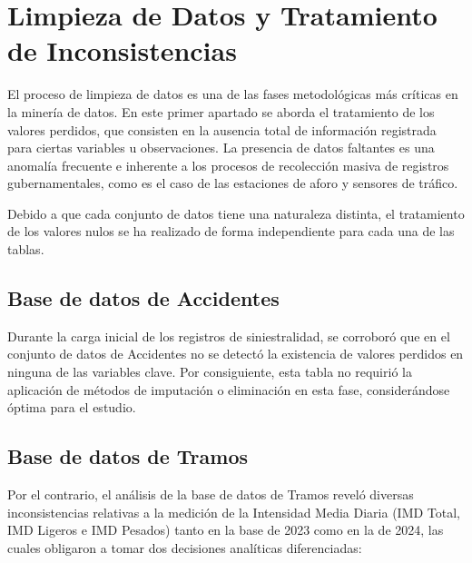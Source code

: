 \documentclass[twoside,a4paper,12pt,onecolumn,openany]{book}
\begin{document}
\setcounter{section}{0}
\setcounter{figure}{0}\setcounter{table}{0}

\section{Limpieza de Datos y Tratamiento de Inconsistencias}
\vspace{0.5cm}

El proceso de limpieza de datos es una de las fases metodológicas más críticas en la minería de datos. En este primer apartado se aborda el tratamiento de los valores perdidos, que consisten en la ausencia total de información registrada para ciertas variables u observaciones. La presencia de datos faltantes es una anomalía frecuente e inherente a los procesos de recolección masiva de registros gubernamentales, como es el caso de las estaciones de aforo y sensores de tráfico.

\vspace{0.5cm}

Debido a que cada conjunto de datos tiene una naturaleza distinta, el tratamiento de los valores nulos se ha realizado de forma independiente para cada una de las tablas.

\vspace{0.5cm}
\subsection{Base de datos de Accidentes}

Durante la carga inicial de los registros de siniestralidad, se corroboró que en el conjunto de datos de Accidentes no se detectó la existencia de valores perdidos en ninguna de las variables clave. Por consiguiente, esta tabla no requirió la aplicación de métodos de imputación o eliminación en esta fase, considerándose óptima para el estudio.

\vspace{0.5cm}
\subsection{Base de datos de Tramos}

Por el contrario, el análisis de la base de datos de Tramos reveló diversas inconsistencias relativas a la medición de la Intensidad Media Diaria (IMD Total, IMD Ligeros e IMD Pesados) tanto en la base de 2023 como en la de 2024, las cuales obligaron a tomar dos decisiones analíticas diferenciadas:

\vspace{0.5cm}
\end{document}
